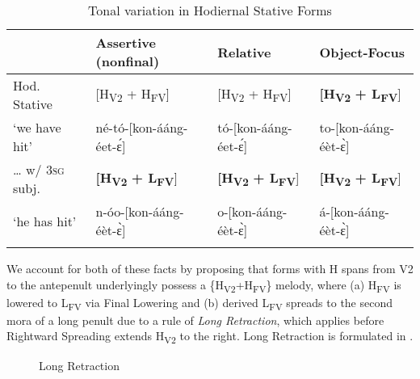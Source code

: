 \documentclass[output=paper,newtxmath,modfonts,nonflat,draft]{langsci/langscibook}
\begin{document}
\begin{table}
\begin{tabularx}{\textwidth}{p{}lll} 
\lsptoprule
&  Assertive (nonfinal) &  Relative &  Object-Focus\\
\midrule
Hod. Stative & [H\textsubscript{V2} + H\textsubscript{FV}] & [H\textsubscript{V2} + H\textsubscript{FV}] & \textbf{[H\textsubscript{V2}} \textbf{+ L\textsubscript{FV}}]\\
‘we have hit’ &
\small né-tó-[kon-ááng-éet-\'ɛ] &
\small tó-[kon-ááng-éet-\'ɛ] &
\small to-[kon-ááng-éèt-\`ɛ]\\
… w/ \textsc{3sg} subj. & \textbf{[H\textsubscript{V2}} \textbf{+ L\textsubscript{FV}}] & \textbf{[H\textsubscript{V2}} \textbf{+ L\textsubscript{FV}}] & \textbf{[H\textsubscript{V2}} \textbf{+ L\textsubscript{FV}}]\\
‘he has hit’ &
\small n-óo-[kon-ááng-éèt-\`ɛ] &
\small o-[kon-ááng-éèt-\`ɛ] &
\small á-[kon-ááng-éèt-\`ɛ]\\
\lspbottomrule
\end{tabularx}
\caption{Tonal variation in Hodiernal Stative Forms}
\label{tab:jones:4}
\end{table}


We account for both of these facts by proposing that forms with H spans from V2 to the antepenult underlyingly possess a \{H\textsubscript{V2}+H\textsubscript{FV}\} melody, where (a) H\textsubscript{FV} is lowered to L\textsubscript{FV} via Final Lowering  and (b) derived L\textsubscript{FV} spreads to the second mora of a long penult due to a rule of \textit{Long Retraction}, which applies before Rightward Spreading extends H\textsubscript{V2} to the right. Long Retraction is formulated in .

  
 
\begin{figure}
\caption{Long Retraction}
\label{fig:jones:1}	
\end{figure}
\end{document}

